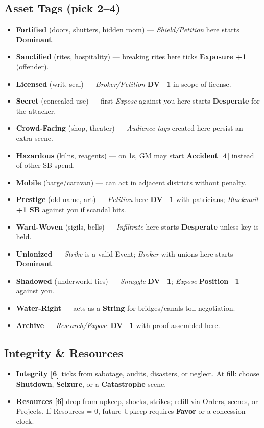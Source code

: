   \subsection{Asset Tags (pick 2--4)}
  \begin{itemize}
    \item \textbf{Fortified} (doors, shutters, hidden room) --- \emph{Shield/Petition} here starts \textbf{Dominant}.
    \item \textbf{Sanctified} (rites, hospitality) --- breaking rites here ticks \textbf{Exposure +1} (offender).
    \item \textbf{Licensed} (writ, seal) --- \emph{Broker/Petition} \textbf{DV --1} in scope of license.
    \item \textbf{Secret} (concealed use) --- first \emph{Expose} against you here starts \textbf{Desperate} for the attacker.
    \item \textbf{Crowd-Facing} (shop, theater) --- \emph{Audience tags} created here persist an extra scene.
    \item \textbf{Hazardous} (kilns, reagents) --- on 1s, GM may start \textbf{Accident [4]} instead of other SB spend.
    \item \textbf{Mobile} (barge/caravan) --- can act in adjacent districts without penalty.
    \item \textbf{Prestige} (old name, art) --- \emph{Petition} here \textbf{DV --1} with patricians; \emph{Blackmail} \textbf{+1 SB} against you if scandal hits.
    \item \textbf{Ward-Woven} (sigils, bells) --- \emph{Infiltrate} here starts \textbf{Desperate} unless key is held.
    \item \textbf{Unionized} --- \emph{Strike} is a valid Event; \emph{Broker} with unions here starts \textbf{Dominant}.
    \item \textbf{Shadowed} (underworld ties) --- \emph{Smuggle} \textbf{DV --1}; \emph{Expose} \textbf{Position --1} against you.
    \item \textbf{Water-Right} --- acts as a \textbf{String} for bridges/canals toll negotiation.
    \item \textbf{Archive} --- \emph{Research/Expose} \textbf{DV --1} with proof assembled here.
  \end{itemize}
  
  \subsection{Integrity \& Resources}
  \begin{itemize}
    \item \textbf{Integrity [6]} ticks from sabotage, audits, disasters, or neglect. At fill: choose \textbf{Shutdown}, \textbf{Seizure}, or a \textbf{Catastrophe} scene.
    \item \textbf{Resources [6]} drop from upkeep, shocks, strikes; refill via Orders, scenes, or Projects. If Resources = 0, future Upkeep requires \textbf{Favor} or a concession clock.
  \end{itemize}
  
